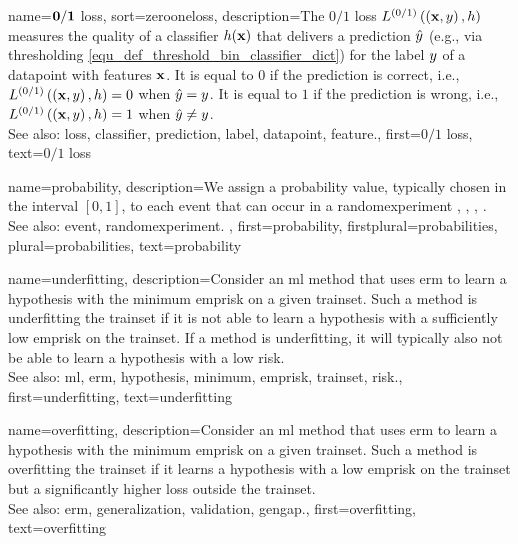{name={$\bf 0/1$ loss},
sort={zerooneloss}, 
	description={The $0/1$ \gls{loss} $L^{(0/1)}\left(\left( {\bf x},y \right),h \right)$ 
		measures the quality of a \gls{classifier} $h({\bf x})$ that delivers a 
		\gls{prediction} $\hat{y}$ (e.g., via thresholding \eqref{equ_def_threshold_bin_classifier_dict}) 
		for the \gls{label} $y$ of a \gls{datapoint} with \glspl{feature} ${\bf x}$. It is equal to $0$ if 
		the \gls{prediction} is correct, i.e., 
		$L^{(0/1)}\left(\left( {\bf x},y \right),h \right)=0$ when $\hat{y}=y$. It is 
		equal to $1$ if the \gls{prediction} is wrong, i.e., $L^{(0/1)}\left(\left( {\bf x},y \right),h \right)=1$ 
		when $\hat{y}\neq y$.
				\\ 
		See also: \gls{loss}, \gls{classifier}, \gls{prediction}, \gls{label}, \gls{datapoint}, \gls{feature}.},
    	first={$0/1$ loss},
	text={$0/1$ loss}
}

{name={probability}, 
	description={We assign a probability value, typically chosen in the 
		interval $[0,1]$, to each \gls{event} that can occur in a \gls{randomexperiment}  
		\cite{BillingsleyProbMeasure}, \cite{BertsekasProb}, \cite{HalmosMeasure},  \cite{KallenbergBook}.
		\\
		See also: \gls{event}, \gls{randomexperiment}. },
	first={probability},
	firstplural={probabilities},
	plural={probabilities},
	text={probability}
}
	
{name={underfitting},
	description={Consider 
		an \gls{ml} method that uses \gls{erm} to learn a \gls{hypothesis} with the \gls{minimum} \gls{emprisk} 
		on a given \gls{trainset}. Such a method is underfitting the \gls{trainset} if it is 
		not able to learn a \gls{hypothesis} with a sufficiently low \gls{emprisk} on the \gls{trainset}. 
		If a method is underfitting, it will typically also not be able to learn a \gls{hypothesis} with 
		a low \gls{risk}.
					\\ 
		See also: \gls{ml}, \gls{erm}, \gls{hypothesis}, \gls{minimum}, \gls{emprisk}, \gls{trainset}, \gls{risk}.},
	first={underfitting},
	text={underfitting}
}

{name={overfitting},
	description={Consider an 
		\gls{ml} method that uses \gls{erm} to learn a \gls{hypothesis} with the \gls{minimum} \gls{emprisk} on 
		a given \gls{trainset}. Such a method is overfitting the \gls{trainset} if it learns 
		a \gls{hypothesis} with a low \gls{emprisk} on the \gls{trainset} but a significantly higher \gls{loss} outside the \gls{trainset}.
					\\ 
		See also: \gls{erm}, \gls{generalization}, \gls{validation}, \gls{gengap}.},
	first={overfitting},
	text={overfitting}
}

